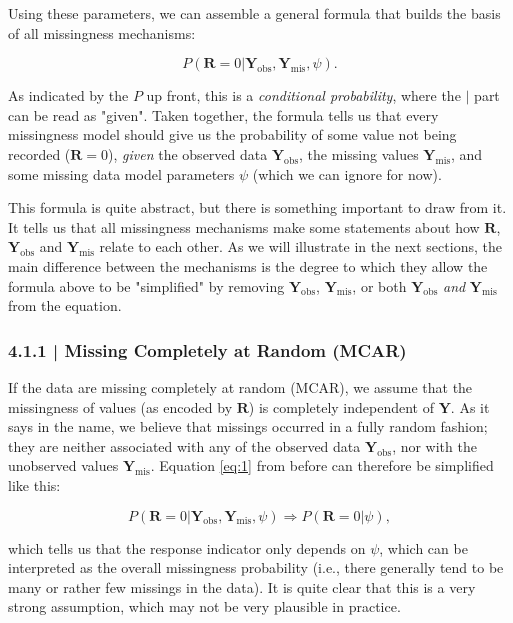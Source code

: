 Using these parameters, we can assemble a general formula that builds the basis of all missingness mechanisms:

\begin{equation} \label{eq:1}
P(\mathbf{R}=0|\mathbf{Y}_{\text{obs}}, \mathbf{Y}_{\text{mis}}, \psi).
\end{equation}


As indicated by the $P$ up front, this is a \emph{conditional probability}, where the $|$ part can be read as "given". Taken together, the formula tells us that every missingness model should give us the probability of some value not being recorded ($\mathbf{R}=0$), \emph{given} the observed data $\mathbf{Y}_{\text{obs}}$, the missing values $\mathbf{Y}_{\text{mis}}$, and some missing data model parameters $\psi$ (which we can ignore for now). 

This formula is quite abstract, but there is something important to draw from it. It tells us that all missingness mechanisms make some statements about how $\mathbf{R}$, $\mathbf{Y}_{\text{obs}}$ and $\mathbf{Y}_{\text{mis}}$ relate to each other. As we will illustrate in the next sections, the main difference between the mechanisms is the degree to which they allow the formula above to be "simplified" by removing $\mathbf{Y}_{\text{obs}}$,  $\mathbf{Y}_{\text{mis}}$, or both $\mathbf{Y}_{\text{obs}}$ \emph{and} $\mathbf{Y}_{\text{mis}}$ from the equation. 


\subsubsection{{\normalfont\textsf{\textcolor{sBlue}{\small 4.1.1 |}}} Missing Completely at Random (MCAR)}

If the data are missing completely at random (MCAR), we assume that the missingness of values (as encoded by $\mathbf{R}$) is completely independent of $\mathbf{Y}$. As it says in the name, we believe that missings occurred in a fully random fashion; they are neither associated with any of the observed data $\mathbf{Y}_{\text{obs}}$, nor with the unobserved values $\mathbf{Y}_{\text{mis}}$. Equation \ref{eq:1} from before can therefore be simplified like this:

\begin{equation}
P(\mathbf{R}=0|\mathbf{Y}_{\text{obs}}, \mathbf{Y}_{\text{mis}}, \psi) \Rightarrow P(\mathbf{R}=0|\psi),
\end{equation}

which tells us that the response indicator only depends on $\psi$, which can be interpreted as the overall missingness probability (i.e., there generally tend to be many or rather few missings in the data). It is quite clear that this is a very strong assumption, which may not be very plausible in practice. 


